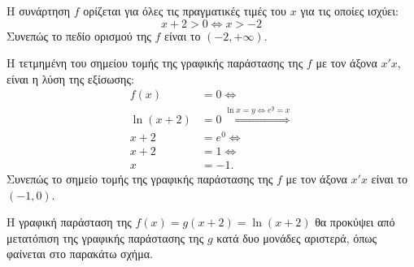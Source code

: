 \begin{alist}
\item Η συνάρτηση $f$ ορίζεται για όλες τις πραγματικές τιμές του $x$ για τις οποίες ισχύει:
\[x + 2 > 0 \Leftrightarrow x > -2\]
Συνεπώς το πεδίο ορισμού της $f$ είναι το $(-2, +\infty)$.
\item Η τετμημένη του σημείου τομής της γραφικής παράστασης της $f$ με τον άξονα $x'x$, είναι η λύση της εξίσωσης:
\begin{align*}
f(x) &= 0 \Leftrightarrow \\
\ln(x + 2) &= 0 \overset{\ln x = y \Leftrightarrow e^y = x}{\Leftrightarrow} \\
x + 2 &= e^0 \Leftrightarrow \\
x + 2 &= 1 \Leftrightarrow \\
x &= -1.
\end{align*}
Συνεπώς το σημείο τομής της γραφικής παράστασης της $f$ με τον άξονα $x'x$ είναι το $(-1, 0)$.
\item Η γραφική παράσταση της $f(x) = g(x + 2) = \ln(x + 2)$ θα προκύψει από μετατόπιση της γραφικής παράστασης της $g$ κατά δυο μονάδες αριστερά, όπως φαίνεται στο παρακάτω σχήμα.
\begin{center}
\end{center}
\end{alist}

